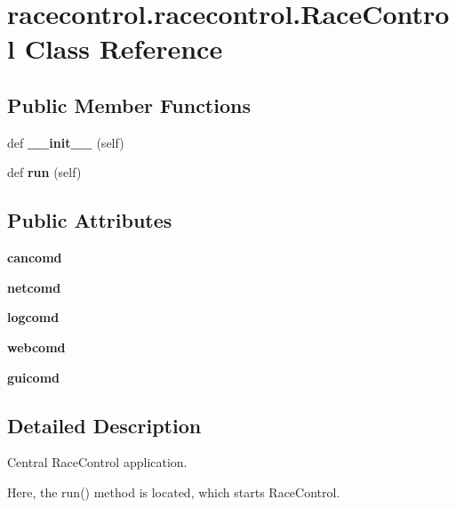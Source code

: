 \section{racecontrol.\+racecontrol.\+Race\+Control Class Reference}
\label{classracecontrol_1_1racecontrol_1_1RaceControl}
\subsection*{Public Member Functions}
\begin{DoxyCompactItemize}
\item 
def {\bfseries \+\_\+\+\_\+init\+\_\+\+\_\+} (self)\label{classracecontrol_1_1racecontrol_1_1RaceControl_a9241f59905e35d54c4f4828aaedee07e}

\item 
def {\bf run} (self)
\end{DoxyCompactItemize}
\subsection*{Public Attributes}
\begin{DoxyCompactItemize}
\item 
{\bfseries cancomd}\label{classracecontrol_1_1racecontrol_1_1RaceControl_a4103417046b82e9885e9597ed75b1b58}

\item 
{\bfseries netcomd}\label{classracecontrol_1_1racecontrol_1_1RaceControl_a8cc986ca81d49bdeeaff88421c5c5355}

\item 
{\bfseries logcomd}\label{classracecontrol_1_1racecontrol_1_1RaceControl_ac7be58bf7c10da9ec74d0f455a12446c}

\item 
{\bfseries webcomd}\label{classracecontrol_1_1racecontrol_1_1RaceControl_aee108cfb7ca5df5d3dfc1f074a495e7f}

\item 
{\bfseries guicomd}\label{classracecontrol_1_1racecontrol_1_1RaceControl_a54a95d20feb3b29c4b31383203c9b796}

\end{DoxyCompactItemize}


\subsection{Detailed Description}
\begin{DoxyVerb}Central RaceControl application.

Here, the run() method is located, which starts RaceControl.
\end{DoxyVerb}
 

